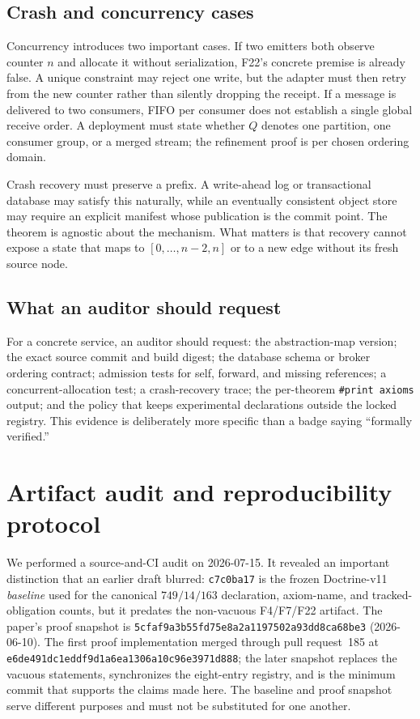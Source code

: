 \documentclass[11pt,letterpaper]{article}
\theoremstyle{definition}
\begin{document}
\subsection{Crash and concurrency cases}

Concurrency introduces two important cases. If two emitters both observe
counter $n$ and allocate it without serialization, F22's concrete premise is
already false. A unique constraint may reject one write, but the adapter must
then retry from the new counter rather than silently dropping the receipt. If a
message is delivered to two consumers, FIFO per consumer does not establish a
single global receive order. A deployment must state whether $Q$ denotes one
partition, one consumer group, or a merged stream; the refinement proof is per
chosen ordering domain.

Crash recovery must preserve a prefix. A write-ahead log or transactional
database may satisfy this naturally, while an eventually consistent object
store may require an explicit manifest whose publication is the commit point.
The theorem is agnostic about the mechanism. What matters is that recovery
cannot expose a state that maps to $[0,\ldots,n-2,n]$ or to a new edge without
its fresh source node.

\subsection{What an auditor should request}

For a concrete service, an auditor should request: the abstraction-map version;
the exact source commit and build digest; the database schema or broker ordering
contract; admission tests for self, forward, and missing references; a
concurrent-allocation test; a crash-recovery trace; the per-theorem
\texttt{\#print axioms} output; and the policy that keeps experimental
declarations outside the locked registry. This evidence is deliberately more
specific than a badge saying ``formally verified.''

\section{Artifact audit and reproducibility protocol}
\label{sec:artifact}

We performed a source-and-CI audit on 2026-07-15. It revealed an important
distinction that an earlier draft blurred: \texttt{c7c0ba17} is the frozen
Doctrine-v11 \emph{baseline} used for the canonical $749/14/163$ declaration,
axiom-name, and tracked-obligation counts, but it predates the non-vacuous
F4/F7/F22 artifact. The paper's proof snapshot is
\texttt{5cfaf9a3b55fd75e8a2a1197502a93dd8ca68be3} (2026-06-10).
The first proof implementation merged through pull request~185 at
\texttt{e6de491dc1eddf9d1a6ea1306a10c96e3971d888}; the later snapshot replaces
the vacuous statements, synchronizes the eight-entry registry, and is the
minimum commit that supports the claims made here. The baseline and proof
snapshot serve different purposes and must not be substituted for one another.
\end{document}
